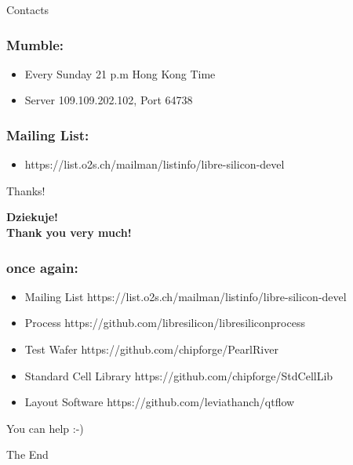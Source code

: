 \documentclass{beamer}
\begin{document}
\begin{frame}
Contacts
\end{frame}

\begin{frame}
\frametitle{Mumble:}
\begin{itemize}
\item Every Sunday 21 p.m Hong Kong Time
\item Server 109.109.202.102, Port 64738
\end{itemize}
\end{frame}


\begin{frame}
\frametitle{Mailing List:}
\begin{itemize}
\item https://list.o2s.ch/mailman/listinfo/libre-silicon-devel
\end{itemize}
\end{frame}


\begin{frame}{Thanks!}
	\begin{center}
		\textbf{Dziekuje!} \\
		\textbf{Thank you very much!} \\
	\end{center}
\end{frame}


\begin{frame}
\frametitle{once again:}
\begin{itemize}
\item Mailing List
https://list.o2s.ch/mailman/listinfo/libre-silicon-devel
\item Process
https://github.com/libresilicon/libresiliconprocess
\item Test Wafer
https://github.com/chipforge/PearlRiver
\item Standard Cell Library
https://github.com/chipforge/StdCellLib
\item Layout Software
https://github.com/leviathanch/qtflow
\end{itemize}
\Huge{\centerline{You can help :-)}}
\end{frame}


\begin{frame}
\Huge{\centerline{The End}}
\end{frame}

\end{document}
